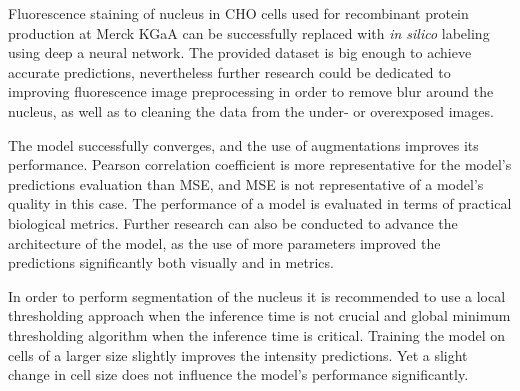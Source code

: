 Fluorescence staining of nucleus in CHO cells used for recombinant protein production at Merck KGaA can be successfully replaced with \textit{in silico} labeling using deep a neural network. The provided dataset is big enough to achieve accurate predictions, nevertheless further research could be dedicated to improving fluorescence image preprocessing in order to remove blur around the nucleus, as well as to cleaning the data from the under- or overexposed images.

The model successfully converges, and the use of augmentations improves its performance. Pearson correlation coefficient is more representative for the model's predictions evaluation than MSE, and MSE is not representative of a model's quality in this case. The performance of a model is evaluated in terms of practical biological metrics. Further research can also be conducted to advance the architecture of the model, as the use of more parameters improved the predictions significantly both visually and in metrics.

In order to perform segmentation of the nucleus it is recommended to use a local thresholding approach when the inference time is not crucial and global minimum thresholding algorithm when the inference time is critical. Training the model on cells of a larger size slightly improves the intensity predictions. Yet a slight change in cell size does not influence the model's performance significantly.
